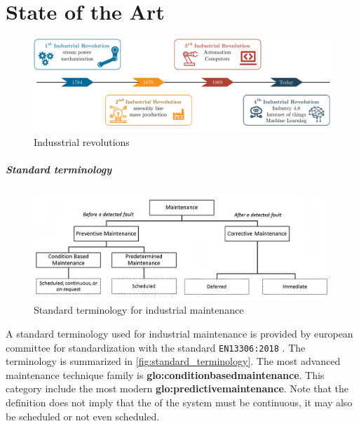 \chapter{State of the Art}
\label{ch:state_of_the_art}

\begin{figure}[h]
    \centering
    \includegraphics[width=\textwidth]{images/StateArt/Industry40.pdf}
    \caption{Indusstrial revolutions}
    \label{fig:ind40}    
\end{figure}



\paragraph*{Standard terminology}
\begin{figure}
    \centering
    \includegraphics[width=\textwidth]{images/StateArt/EN13306.png}
    \caption{Standard terminology for industrial maintenance \cite{rastegari2017condition}}
    \label{fig:standard_terminology}
\end{figure}

A standard terminology used for industrial maintenance is provided by european committee for standardization with the standard \texttt{EN13306:2018} \cite{EN13306:2018}. The terminology is summarized in \autoref{fig:standard_terminology}. The most advanced maintenance technique family is \textbf{\gls{glo:conditionbasedmaintenance}}. This category include the most modern \textbf{\gls{glo:predictivemaintenance}}. Note that the definition does not imply that the  of the system must be continuous, it may also be scheduled or not even scheduled.

